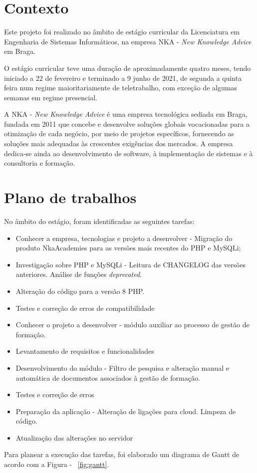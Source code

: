 \section{Contexto}
\par Este projeto foi realizado no âmbito de estágio curricular da Licenciatura em Engenharia de Sistemas Informáticos, na empresa NKA - \textit{New Knowledge Advice} em Braga.
\par O estágio curricular teve uma duração de aproximadamente quatro meses, tendo iniciado a 22 de fevereiro e terminado a 9 junho de 2021, de segunda a quinta feira num regime maioritariamente de teletrabalho, com exceção de algumas semanas em regime presencial.
\par A NKA - \textit{New Knowledge Advice} é uma empresa tecnológica sediada em Braga, fundada em 2011 que concebe e desenvolve soluções globais vocacionadas para a otimização de cada negócio, por meio de projetos específicos, fornecendo as soluções mais adequadas às crescentes exigências dos mercados. A empresa dedica-se ainda ao desenvolvimento de software, à implementação de sistemas e à consultoria e formação. %

\section{Plano de trabalhos}

No âmbito do estágio, foram identificadas as seguintes tarefas:

\begin{itemize}
    \item  Conhecer a empresa, tecnologias e projeto a desenvolver - Migração do produto NkaAcademies para as versões mais recentes do PHP e MySQLi;
    \item  Investigação sobre PHP e MySQLi - Leitura de CHANGELOG das versões anteriores. Análise de funções \textit{deprecated}.
    \item  Alteração do código para a versão 8 PHP.
    \item  Testes e correção de erros de compatibilidade
    \item  Conhecer o projeto a desenvolver - módulo auxiliar ao processo de gestão de formação.
    \item Levantamento de requisitos e funcionalidades
    \item  Desenvolvimento do módulo - Filtro de pesquisa e alteração manual e automática de documentos associados à gestão de formação.
    \item Testes e correção de erros
    \item  Preparação da aplicação - Alteração de ligações para cloud. Limpeza de código.
    \item Atualização das alterações no servidor
\end{itemize}
Para planear a execução das tarefas, foi elaborado um diagrama de Gantt de acordo com a Figura - ~\ref{fig:gantt}.

